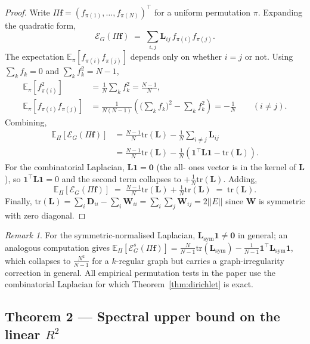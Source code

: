 \documentclass[11pt,a4paper]{article}
\newcommand{\E}{\mathbb{E}}
\newcommand{\tr}{\mathrm{tr}}
\newcommand{\1}{\mathbb{1}}
\newcommand{\bW}{\mathbf{W}}
\newcommand{\bD}{\mathbf{D}}
\newcommand{\bz}{\mathbf{0}}
\newcommand{\bone}{\mathbf{1}}
\newcommand{\bff}{\mathbf{f}}
\newcommand{\Lsym}{\mathbf{L}_{\mathrm{sym}}}
\newcommand{\Lcomb}{\mathbf{L}}
\theoremstyle{plain}
\theoremstyle{definition}
\theoremstyle{remark}
\newtheorem{remark}[theorem]{Remark}
\begin{document}
\begin{proof}
Write $\Pi\bff = (f_{\pi(1)}, \ldots, f_{\pi(N)})^\top$ for a
uniform permutation $\pi$.  Expanding the quadratic form,
\[
    \mathcal{E}_G(\Pi\bff)
    \;=\; \sum_{i,j} \Lcomb_{ij}\, f_{\pi(i)} f_{\pi(j)}.
\]
The expectation $\E_\pi[f_{\pi(i)} f_{\pi(j)}]$ depends only on
whether $i = j$ or not.  Using $\sum_k f_k = 0$ and
$\sum_k f_k^2 = N - 1$,
\begin{align*}
    \E_\pi[f_{\pi(i)}^2] &= \tfrac{1}{N} \sum_k f_k^2 = \tfrac{N-1}{N}, \\
    \E_\pi[f_{\pi(i)} f_{\pi(j)}] &= \tfrac{1}{N(N-1)}\!\left( \big(\sum_k f_k\big)^2 - \sum_k f_k^2 \right)
        = -\tfrac{1}{N} \qquad (i \neq j).
\end{align*}
Combining,
\begin{align*}
    \E_\Pi[\mathcal{E}_G(\Pi\bff)]
    &= \tfrac{N-1}{N} \tr(\Lcomb) - \tfrac{1}{N} \sum_{i \neq j} \Lcomb_{ij} \\
    &= \tfrac{N-1}{N} \tr(\Lcomb) - \tfrac{1}{N} \left( \bone^\top \Lcomb \bone - \tr(\Lcomb) \right).
\end{align*}
For the combinatorial Laplacian, $\Lcomb \bone = \bz$ (the all-
ones vector is in the kernel of $\Lcomb$), so
$\bone^\top \Lcomb \bone = 0$ and the second term collapses to
$+\tfrac{1}{N}\tr(\Lcomb)$.  Adding,
\[
    \E_\Pi[\mathcal{E}_G(\Pi\bff)]
    \;=\; \tfrac{N-1}{N}\tr(\Lcomb) + \tfrac{1}{N}\tr(\Lcomb)
    \;=\; \tr(\Lcomb).
\]
Finally, $\tr(\Lcomb) = \sum_i \bD_{ii} - \sum_i \bW_{ii}
= \sum_i \sum_j \bW_{ij} = 2 |\!| E |\!|$ since $\bW$ is
symmetric with zero diagonal.
\end{proof}

\begin{remark}
For the symmetric-normalised Laplacian, $\Lsym \bone \neq \bz$
in general; an analogous computation gives
$\E_\Pi[\mathcal{E}_G^s(\Pi\bff)]
= \tfrac{N}{N-1}\tr(\Lsym) - \tfrac{1}{N-1}\bone^\top\Lsym\bone$,
which collapses to $\tfrac{N^2}{N-1}$ for a $k$-regular graph
but carries a graph-irregularity correction in general.  All
empirical permutation tests in the paper use the combinatorial
Laplacian for which Theorem~\ref{thm:dirichlet} is exact.
\end{remark}

\subsection{Theorem 2 — Spectral upper bound on the linear $R^2$}
\end{document}
